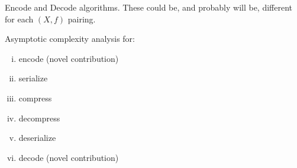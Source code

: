 Encode and Decode algorithms.
These could be, and probably will be, different for each $(X, f)$ pairing.

Asymptotic complexity analysis for:
\begin{enumerate}[i.]
    \item encode (novel contribution)
    \item serialize
    \item compress
    \item decompress
    \item deserialize
    \item decode (novel contribution)
\end{enumerate}

